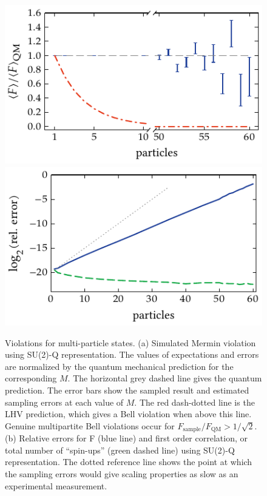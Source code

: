 \begin{figure}
    \centerline{%
    \includegraphics{figures_generated/bell/ghz_violations.pdf}%
    \includegraphics{figures_generated/bell/ghz_errors.pdf}}

    \caption{
    Violations for multi-particle  states.
    (a) Simulated Mermin violation using SU(2)-Q representation.
    The values of expectations and errors are normalized by the quantum mechanical prediction for the corresponding $M$.
    The horizontal grey dashed line gives the quantum prediction.
    The error bars show the sampled result and estimated sampling errors at each value of $M$.
    The red dash-dotted line is the LHV prediction, which gives a Bell violation when above this line.
    Genuine multipartite Bell violations occur for $F_{\mathrm{sample}}/F_{\mathrm{QM}}>1/\sqrt{2}$.
    (b) Relative errors for F (blue line) and first order correlation, or total number of ``spin-ups'' (green dashed line) using SU(2)-Q representation.
    The dotted reference line shows the point at which the sampling errors would give scaling properties as slow as an experimental measurement.}

    \label{fig:bell-ineq:ghz:violation}
\end{figure}


